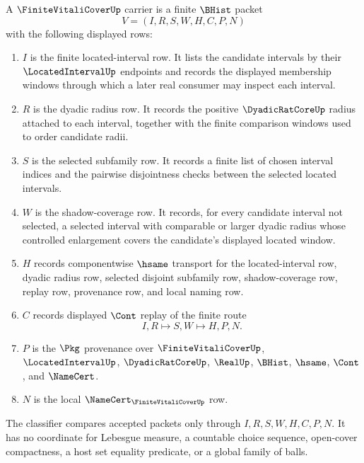\begin{definition}\label{def:finite-vitali-cover-carrier}
A $\FiniteVitaliCoverUp$ carrier is a finite $\BHist$ packet
$$
V=(I,R,S,W,H,C,P,N)
$$
with the following displayed rows:
\begin{enumerate}
\item $I$ is the finite located-interval row. It lists the candidate intervals by their $\LocatedIntervalUp$ endpoints and records the displayed membership windows through which a later real consumer may inspect each interval.
\item $R$ is the dyadic radius row. It records the positive $\DyadicRatCoreUp$ radius attached to each interval, together with the finite comparison windows used to order candidate radii.
\item $S$ is the selected subfamily row. It records a finite list of chosen interval indices and the pairwise disjointness checks between the selected located intervals.
\item $W$ is the shadow-coverage row. It records, for every candidate interval not selected, a selected interval with comparable or larger dyadic radius whose controlled enlargement covers the candidate's displayed located window.
\item $H$ records componentwise $\hsame$ transport for the located-interval row, dyadic radius row, selected disjoint subfamily row, shadow-coverage row, replay row, provenance row, and local naming row.
\item $C$ records displayed $\Cont$ replay of the finite route
$$
I,R \longmapsto S,W \longmapsto H,P,N .
$$
\item $P$ is the $\Pkg$ provenance over $\FiniteVitaliCoverUp$, $\LocatedIntervalUp$, $\DyadicRatCoreUp$, $\RealUp$, $\BHist$, $\hsame$, $\Cont$, and $\NameCert$.
\item $N$ is the local $\NameCert_{\FiniteVitaliCoverUp}$ row.
\end{enumerate}
The classifier compares accepted packets only through $I,R,S,W,H,C,P,N$. It has no coordinate for Lebesgue measure, a countable choice sequence, open-cover compactness, a host set equality predicate, or a global family of balls.
\end{definition}

